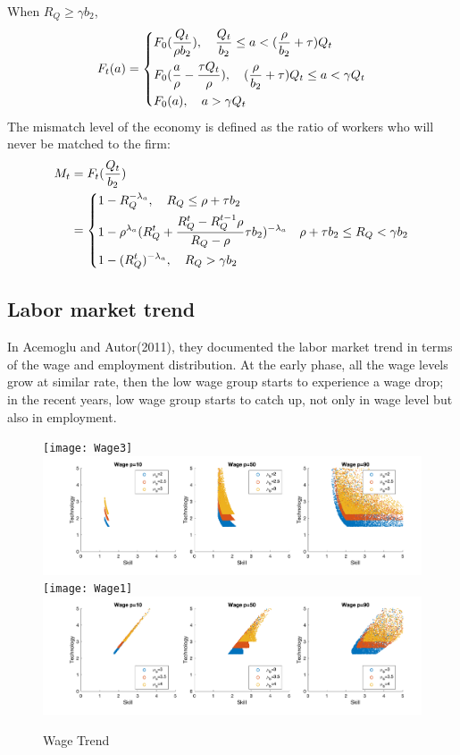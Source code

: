 \documentclass{article}
\newcommand{\1}{\mathbb{1}}
\begin{document}
When $R_Q \geq \gamma b_2$, 
\begin{align*}
F_t(a)
&= \begin{dcases}
F_0(\frac{Q_t}{\rho b_2}),\quad  \frac{Q_t}{b_2} \leq a <(\frac{\rho}{b_2}+\tau)Q_t  \\
F_0(\frac{a}{\rho}-\frac{\tau Q_t}{\rho}), \quad (\frac{\rho}{b_2}+\tau)Q_t  \leq a < \gamma Q_t \\
F_0(a), \quad  a>\gamma Q_t \\
\end{dcases} \\
\end{align*}
The mismatch level of the economy is defined as the ratio of workers who will never be matched to the firm: 
\begin{align*}
M_t &= F_t(\frac{Q_t}{b_2}) \\
&= \begin{dcases}
1-R_Q^{-\lambda_a}, \quad R_Q \leq \rho+\tau b_2 \\
1-\rho^{\lambda_a}(R_Q^t+\frac{R_Q^t-R_Q^{t-1}\rho}{R_Q-\rho}\tau b_2)^{-\lambda_a} \quad \rho+\tau b_2 \leq R_Q <\gamma b_2 \\
1-(R_Q^t)^{-\lambda_a}, \quad R_Q> \gamma b_2
\end{dcases} 
\end{align*}
\subsection{Labor market trend}
In Acemoglu and Autor(2011)\cite{AcemogluAutor2011}, they documented the labor market trend in terms of the wage and employment distribution. At the early phase, all the wage levels grow at similar rate, then the low wage group starts to experience a wage drop; in the recent years, low wage group starts to catch up, not only in wage level but also in employment. 
\begin{figure}[h!]
\centering
\caption{Wage Trend}
\label{Wage1}
\texttt{[image: Wage3]}
\includegraphics[width=\textwidth]{Task3}
\texttt{[image: Wage1]}
\includegraphics[width=\textwidth]{Task1}
\end{figure}
\end{document}
